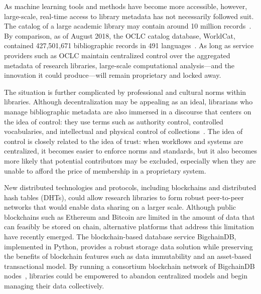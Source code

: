 As machine learning tools and methods have become more accessible,
however, large-scale, real-time access to library metadata has not
necessarily followed suit. The catalog of a large academic library may
contain around 10 million records~\cite{yul18}. By comparison, as of August
2018, the OCLC catalog database, WorldCat, contained 427,501,671
bibliographic records in 491 languages~\cite{oclc18}. As long as service
providers such as OCLC maintain centralized control over the aggregated
metadata of research libraries, large-scale computational analysis---and the
innovation it could produce---will remain proprietary and locked away.

The situation is further complicated by professional and cultural norms
within libraries. Although decentralization may be appealing as an ideal,
librarians who manage bibliographic metadata are also immersed in a
discourse that centers on the idea of control: they use terms such as
authority control, controlled vocabularies, and intellectual and physical
control of collections~\cite{olson01}. The idea of control is closely
related to the idea of trust: when workflows and systems are centralized, it
becomes easier to enforce norms and standards, but it also becomes more
likely that potential contributors may be excluded, especially when they are
unable to afford the price of membership in a proprietary system.

New distributed technologies and protocols, including blockchains and
distributed hash tables (DHTs), could allow research libraries to form
robust peer-to-peer networks that would enable data sharing on a larger
scale. Although public blockchains such as Ethereum and Bitcoin are limited
in the amount of data that can feasibly be stored on chain, alternative
platforms that address this limitation have recently emerged. The
blockchain-based database service BigchainDB, implemented in Python,
provides a robust storage data solution while preserving the benefits of
blockchain features such as data immutability and an asset-based
transactional model. By running a consortium blockchain network of
BigchainDB nodes~\cite{vButerin15}, libraries could be empowered to abandon 
centralized models and begin managing their data collectively.

